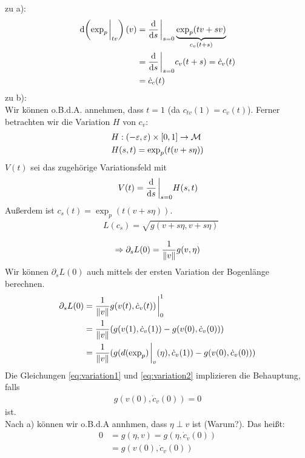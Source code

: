\begin{bew}
zu a):
\begin{align*}
    \dd(\exp_p\eval_{tv})(v) &= \dv{s}\eval_{s=0} \underbrace{\exp_p (tv + sv )}_{c_v(t+s)}\\
    &= \dv{s} \eval_{s=0} c_v (t+s) = \dot{c}_v (t)\\
    &= \dot{c}_c (t)
\end{align*}
zu b):\\
Wir können o.B.d.A. annehmen, dass $t=1$ (da $c_{tv}(1) = c_v (t)$).
Ferner betrachten wir die Variation $H$ von $c_v$:
\begin{align*}
    &H: (-\varepsilon, \varepsilon)\times[0, 1] \to \mathcal{M}\\
    & H(s, t) = \exp_p (t(v + s \eta))
\end{align*}
$V(t)$ sei das zugehörige Variationsfeld mit
\begin{align*}
    V(t) = \dv{s} \eval_{s=0} H(s,t)
\end{align*}
Außerdem ist $c_s(t) = \exp_p (t(v+s\eta))$.
\begin{align*}
    &L(c_s) = \sqrt{g(v + s \eta, v + s \eta)}\\
\end{align*}
\begin{align}
    \label{eq:variation1}
\Rightarrow \partial_s L(0) = \frac{1}{\norm{v}}g(v, \eta)      
\end{align}
Wir können $\partial_s L(0)$ auch mittels der ersten Variation der Bogenlänge berechnen.
\begin{align} 
\partial_s L (0) &= \frac{1}{\norm{v}} g(v(t), \dot{c}_v (t))\eval^1_0\\
&= \frac{1}{\norm{v}} (g(v(1), \dot{c}_v (1)) - g(v(0), \dot{c}_v (0)))\\
\label{eq:variation2}
&= \frac{1}{\norm{v}} (g(d(\exp_p)\eval_v (\eta), \dot{c}_v(1)) - g(v(0), \dot{c}_v (0)))
\end{align}
Die Gleichungen \ref{eq:variation1} und \ref{eq:variation2} implizieren die Behauptung, falls
\begin{align*}
    g(v(0),\dot{c}_v (0)) = 0
\end{align*}
ist.\\
Nach a) können wir o.B.d.A annhmen, dass $\eta \perp v$ ist (Warum?).
Das heißt:
\begin{align*}
    0 &= g(\eta, v) = g(\eta, \dot{c}_v(0))\\
    &= g(v(0), \dot{c}_v (0))
\end{align*}
\end{bew}

